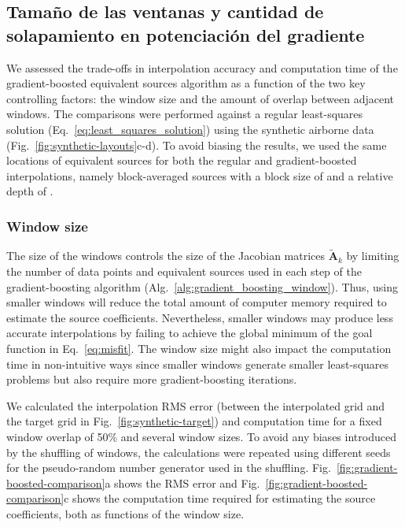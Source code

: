 

\subsection{Tamaño de las ventanas y cantidad de solapamiento en potenciación
del gradiente}
\label{sec:window_size_and_overlap}

We assessed the trade-offs in interpolation accuracy and computation time of
the gradient-boosted equivalent sources algorithm as a function of the two key
controlling factors: the window size and the amount of overlap between adjacent
windows.
The comparisons were performed against a regular least-squares solution
(Eq.~\ref{eq:least_squares_solution}) using the synthetic airborne data
(Fig.~\ref{fig:synthetic-layouts}c-d).
To avoid biasing the results, we used the same locations of equivalent sources
for both the regular and gradient-boosted interpolations, namely
block-averaged sources with a block size of
\BestAirborneBlockAveragedSourcesRelativeDepthSpacing\m{} and a
relative depth of
\BestAirborneBlockAveragedSourcesRelativeDepthDepth\m{}.

\subsubsection{Window size}
\label{sec:window_size}

The size of the windows controls the size of the Jacobian matrices
$\tilde{\mathbf{A}}_k$ by limiting the number of data points and equivalent
sources used in each step of the gradient-boosting algorithm
(Alg.~\ref{alg:gradient_boosting_window}).
Thus, using smaller windows will reduce the total amount of computer memory
required to estimate the source coefficients.
Nevertheless, smaller windows may produce less accurate interpolations by
failing to achieve the global minimum of the goal function in
Eq.~\ref{eq:misfit}.
The window size might also impact the computation time in non-intuitive ways
since smaller windows generate smaller least-squares problems but also require
more gradient-boosting iterations.

We calculated the interpolation RMS error (between the interpolated grid and
the target grid in Fig.~\ref{fig:synthetic-target}) and computation time for a
fixed window overlap of 50\% and several window sizes.
To avoid any biases introduced by the shuffling of windows, the calculations
were repeated using different seeds for the pseudo-random number generator used
in the shuffling.
Fig.~\ref{fig:gradient-boosted-comparison}a shows the RMS error and
Fig.~\ref{fig:gradient-boosted-comparison}c shows the computation time
required for estimating the source coefficients, both as functions of
the window size.

